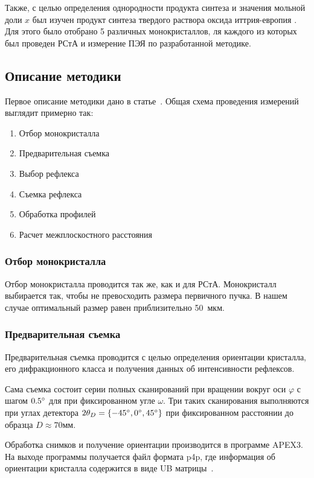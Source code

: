 Также, с целью определения однородности продукта синтеза и значения мольной доли $x$ был изучен продукт синтеза твердого раствора оксида иттрия-европия \YEu.
Для этого было отобрано 5 различных монокристаллов, ля каждого из которых был проведен РСтА и измерение ПЭЯ по разработанной методике.

\subsection{Описание методики}

Первое описание методики дано в статье~\cite{Kudryavtsev:2024:YEu}.
Общая схема проведения измерений выглядит примерно так:
\begin{enumerate}
    \item Отбор монокристалла
    \item Предварительная съемка
    \item Выбор рефлекса
    \item Съемка рефлекса
    \item Обработка профилей
    \item Расчет межплоскостного расстояния
\end{enumerate}
\subsubsection{Отбор монокристалла}
Отбор монокристалла проводится так же, как и для РСтА.
Монокристалл выбирается так, чтобы не превосходить размера первичного пучка.
В нашем случае оптимальный размер равен приблизительно 50~мкм.
\subsubsection{Предварительная съемка}
Предварительная съемка проводится с целью определения ориентации кристалла, его дифракционного класса и получения данных об интенсивности рефлексов.

Сама съемка состоит серии полных сканирований при вращении вокруг оси $\varphi$ с шагом $0.5^\circ$ для при фиксированном угле $\omega$.
Три таких сканирования выполняются при углах детектора $2\theta_D = \{-45^\circ, 0^\circ, 45^\circ\}$ при фиксированном расстоянии до образца $D \approx 70\unit{мм}$.

Обработка снимков и получение ориентации производится в программе APEX3.
На выходе программы получается файл формата p4p, где информация об ориентации кристалла содержится в виде UB матрицы~\cite{Busing:1967}.


